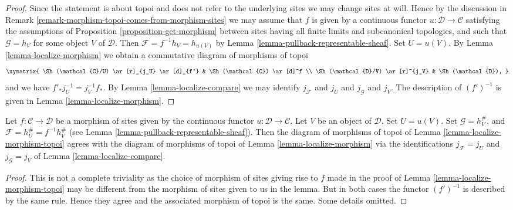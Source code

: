 \begin{proof}
Since the statement is about topoi and does not refer to the underlying
sites we may change sites at will. Hence by the discussion in
Remark \ref{remark-morphism-topoi-comes-from-morphism-sites}
we may assume that $f$ is given by a continuous functor
$u : \mathcal{D} \to \mathcal{C}$ satisfying the assumptions of
Proposition \ref{proposition-get-morphism}
between sites having all finite limits and subcanonical topologies,
and such that $\mathcal{G} = h_V$ for some object $V$ of
$\mathcal{D}$. Then $\mathcal{F} = f^{-1}h_V = h_{u(V)}$ by
Lemma \ref{lemma-pullback-representable-sheaf}.
Set $U = u(V)$.
By
Lemma \ref{lemma-localize-morphism}
we obtain a commutative diagram of morphisms of topoi
$$
\xymatrix{
\Sh(\mathcal{C}/U) \ar[r]_{j_U} \ar[d]_{f'} &
\Sh(\mathcal{C}) \ar[d]^f \\
\Sh(\mathcal{D}/V) \ar[r]^{j_V} &
\Sh(\mathcal{D}),
}
$$
and we have $f'_*j_U^{-1} = j_V^{-1}f_*$. By
Lemma \ref{lemma-localize-compare}
we may identify $j_\mathcal{F}$ and $j_U$
and $j_\mathcal{G}$ and $j_V$. The description of $(f')^{-1}$
is given in
Lemma \ref{lemma-localize-morphism}.
\end{proof}

\begin{lemma}
\label{lemma-localize-morphism-compare}
Let $f : \mathcal{C} \to \mathcal{D}$ be a morphism of sites given
by the continuous functor $u : \mathcal{D} \to \mathcal{C}$.
Let $V$ be an object of $\mathcal{D}$. Set $U = u(V)$.
Set $\mathcal{G} = h_V^\#$, and
$\mathcal{F} = h_U^\# = f^{-1}h_V^\#$ (see
Lemma \ref{lemma-pullback-representable-sheaf}).
Then the diagram of morphisms of topoi of
Lemma \ref{lemma-localize-morphism-topoi}
agrees with the diagram of morphisms of topoi of
Lemma \ref{lemma-localize-morphism}
via the identifications $j_\mathcal{F}= j_U$
and $j_\mathcal{G} = j_V$ of
Lemma \ref{lemma-localize-compare}.
\end{lemma}

\begin{proof}
This is not a complete triviality as the choice of morphism of sites
giving rise to $f$ made in the proof of
Lemma \ref{lemma-localize-morphism-topoi}
may be different from the morphism of sites given to us in the lemma.
But in both cases the functor $(f')^{-1}$ is described by the same
rule. Hence they agree and the associated morphism of topoi is the same.
Some details omitted.
\end{proof}

